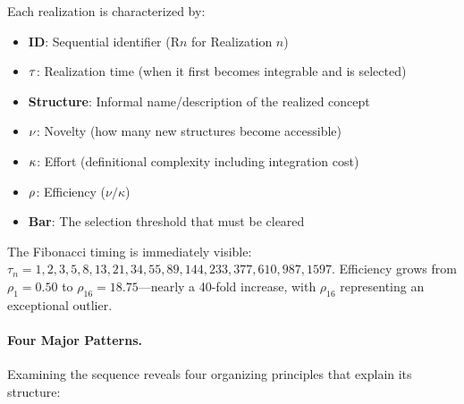 \documentclass[11pt]{article}
\theoremstyle{definition}
\begin{document}
Each realization is characterized by:
\begin{itemize}
\item \textbf{ID}: Sequential identifier (R$n$ for Realization $n$)
\item $\boldmath{\tau}$: Realization time (when it first becomes integrable and is selected)
\item \textbf{Structure}: Informal name/description of the realized concept
\item $\boldmath{\nu}$: Novelty (how many new structures become accessible)
\item $\boldmath{\kappa}$: Effort (definitional complexity including integration cost)
\item $\boldmath{\rho}$: Efficiency ($\nu/\kappa$)
\item \textbf{Bar}: The selection threshold that must be cleared
\end{itemize}

The Fibonacci timing is immediately visible: $\tau_n = 1, 2, 3, 5, 8, 13, 21, 34, 55, 89, 144, 233, 377, 610, 987, 1597$. Efficiency grows from $\rho_1 = 0.50$ to $\rho_{16} = 18.75$—nearly a 40-fold increase, with $\rho_{16}$ representing an exceptional outlier.

\paragraph{Four Major Patterns.}

Examining the sequence reveals four organizing principles that explain its structure:
\end{document}
